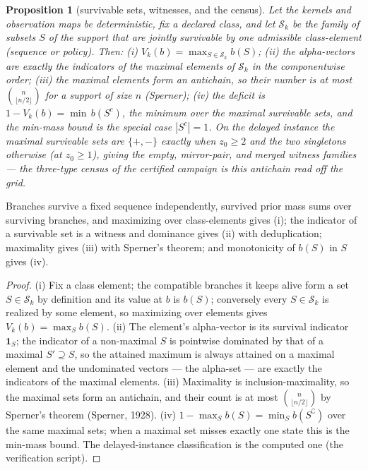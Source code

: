 \documentclass[10pt,twocolumn]{article}
\theoremstyle{plain}
\newtheorem{proposition}[theorem]{Proposition}
\theoremstyle{definition}
\theoremstyle{remark}
\begin{document}
\begin{proposition}[survivable sets, witnesses, and the census]\label{prop:antichain}
Let the kernels and observation maps be deterministic, fix a declared
class, and let \(\mathcal{S}_{k}\) be the family of subsets
\(S\) of the support that are jointly survivable by one admissible
class-element (sequence or policy). Then:
(i) \(V_{k}(b) = \max_{S \in \mathcal{S}_{k}} b(S)\);
(ii) the alpha-vectors are exactly the indicators of the maximal elements
of \(\mathcal{S}_{k}\) in the componentwise order;
(iii) the maximal elements form an antichain, so their number is at
most \(\binom{n}{\lfloor n/2 \rfloor}\) for a support of size
\(n\) (Sperner);
(iv) the deficit is \(1 - V_{k}(b) = \min \, b(S^{c})\), the minimum
over the maximal survivable sets, and the min-mass bound is the special
case \(|S^{c}| = 1\).
On the delayed instance the maximal survivable sets are
\(\{+, -\}\) exactly when \(z_{0} \ge 2\) and the two singletons
otherwise (at \(z_{0} \ge 1\)), giving the empty, mirror-pair, and
merged witness families --- the three-type census of the certified campaign
is this antichain read off the grid.
\end{proposition}

Branches survive a fixed sequence independently, survived prior mass sums
over surviving branches, and maximizing over class-elements gives (i);
the indicator of a survivable set is a witness and dominance gives (ii)
with deduplication; maximality gives (iii) with Sperner's theorem; and
monotonicity of \(b(S)\) in \(S\) gives (iv).

\begin{proof}
(i) Fix a class element; the compatible branches it keeps alive form a
set \(S \in \mathcal{S}_{k}\) by definition and its value at \(b\) is
\(b(S)\); conversely every \(S \in \mathcal{S}_{k}\) is realized by
some element, so maximizing over elements gives
\(V_{k}(b) = \max_{S} b(S)\). (ii) The element's alpha-vector is its
survival indicator \(\mathbf{1}_{S}\); the indicator of a non-maximal
\(S\) is pointwise dominated by that of a maximal \(S' \supseteq S\),
so the attained maximum is always attained on a maximal element and the
undominated vectors --- the alpha-set --- are exactly the indicators of
the maximal elements. (iii) Maximality is inclusion-maximality, so the
maximal sets form an antichain, and their count is at most
\(\binom{n}{\lfloor n/2 \rfloor}\) by Sperner's theorem (Sperner,
1928). (iv) \(1 - \max_{S} b(S) = \min_{S} b(S^{\complement})\) over
the same maximal sets; when a maximal set misses exactly one state this
is the min-mass bound. The delayed-instance classification is the
computed one (the verification script).
\end{proof}
\end{document}

